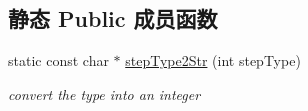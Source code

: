 \subsection*{静态 Public 成员函数}
\begin{DoxyCompactItemize}
\item 
\hypertarget{classg2o_1_1OptimizationAlgorithmDogleg_a65f193c6451ffcd2bd6fd8f8d19e2a12}{static const char $\ast$ \hyperlink{classg2o_1_1OptimizationAlgorithmDogleg_a65f193c6451ffcd2bd6fd8f8d19e2a12}{step\-Type2\-Str} (int step\-Type)}\label{classg2o_1_1OptimizationAlgorithmDogleg_a65f193c6451ffcd2bd6fd8f8d19e2a12}

\begin{DoxyCompactList}\small\item\em convert the type into an integer \end{DoxyCompactList}\end{DoxyCompactItemize}
